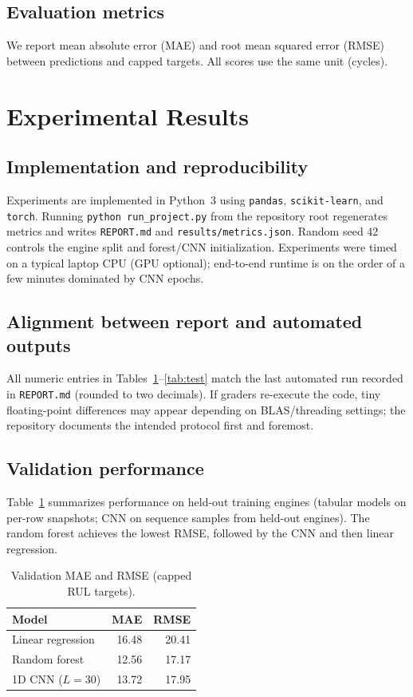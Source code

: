 \documentclass[11pt]{article}
\begin{document}
\subsection{Evaluation metrics}
We report mean absolute error (MAE) and root mean squared error (RMSE) between predictions and capped targets. All scores use the same unit (cycles).

\section{Experimental Results}

\subsection{Implementation and reproducibility}
Experiments are implemented in Python~3 using \texttt{pandas}, \texttt{scikit-learn}, and \texttt{torch}. Running \texttt{python run\_project.py} from the repository root regenerates metrics and writes \texttt{REPORT.md} and \texttt{results/metrics.json}. Random seed 42 controls the engine split and forest/CNN initialization. Experiments were timed on a typical laptop CPU (GPU optional); end-to-end runtime is on the order of a few minutes dominated by CNN epochs.

\subsection{Alignment between report and automated outputs}
All numeric entries in Tables~\ref{tab:val}--\ref{tab:test} match the last automated run recorded in \texttt{REPORT.md} (rounded to two decimals). If graders re-execute the code, tiny floating-point differences may appear depending on BLAS/threading settings; the repository documents the intended protocol first and foremost.

\subsection{Validation performance}
Table~\ref{tab:val} summarizes performance on held-out training engines (tabular models on per-row snapshots; CNN on sequence samples from held-out engines). The random forest achieves the lowest RMSE, followed by the CNN and then linear regression.

\begin{table}[ht]
  \centering
  \caption{Validation MAE and RMSE (capped RUL targets).}
  \label{tab:val}
  \begin{tabular}{lrr}
    \toprule
    Model & MAE & RMSE \\
    \midrule
    Linear regression & 16.48 & 20.41 \\
    Random forest & 12.56 & 17.17 \\
    1D CNN ($L{=}30$) & 13.72 & 17.95 \\
    \bottomrule
  \end{tabular}
\end{table}
\end{document}
